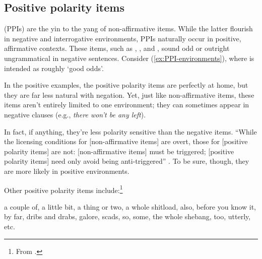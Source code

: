 \subsection{Positive polarity items}

 (PPIs) are the yin to the yang of non-affirmative items. While the latter flourish in negative and interrogative environments, PPIs naturally occur in positive, affirmative contexts. These items, such as , , and , sound odd or outright ungrammatical in negative sentences. Consider (\ref{ex:PPI-environments}), where  is intended as roughly `good odds'.

\ea \label{ex:PPI-environments}
    \ea
        \z
    \ex
        \z
    \z
\z
In the positive examples, the positive polarity items are perfectly at home, but they are far less natural with negation. Yet, just like non-affirmative items, these items aren't entirely limited to one environment; they can sometimes appear in negative clauses (e.g., \emph{ there won't be any left}).

In fact, if anything, they're less polarity sensitive than the negative items. ``While the licensing conditions for [non-affirmative items] are overt, those for [positive polarity items] are not: [non-affirmative items] must be triggered; [positive polarity items] need only avoid being anti-triggered'' \citep[28]{Israel2011}. To be sure, though, they are more likely in positive environments.

Other positive polarity items include:\footnote{From \citet[258--265]{Israel2011}.}

\ea a couple of, a little bit, a thing or two, a whole shitload, also, before you know it, by far, dribs and drabs, galore, scads, so, some, the whole shebang, too, utterly, etc.
\z

